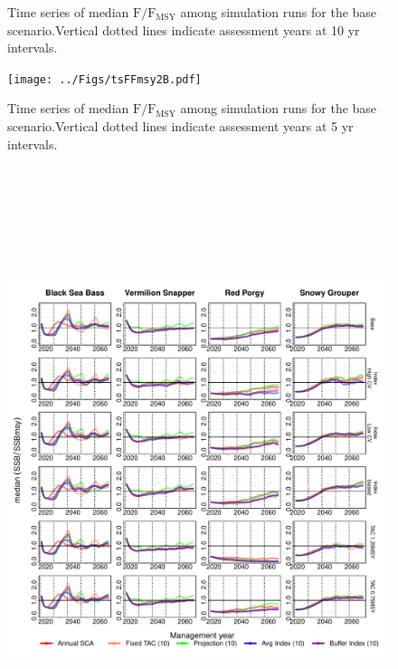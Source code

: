 \documentclass[12pt,english]{article}
\begin{document}
\begin{appendix}
\begin{figure}[!ht]
\begin{center}
\end{center}
\begin{flushleft}
\caption{Time series of median $\mathrm{F/F_{MSY}}$ among simulation runs for the base scenario.Vertical dotted lines indicate assessment years at 10 yr intervals.}
\label{fig:tsFFmsy2}
\end{flushleft}
\end{figure}
\clearpage\begin{figure}[!ht]
\begin{center}
\texttt{[image: ../Figs/tsFFmsy2B.pdf]}
\end{center}
\begin{flushleft}
\caption{Time series of median $\mathrm{F/F_{MSY}}$ among simulation runs for the base scenario.Vertical dotted lines indicate assessment years at 5 yr intervals.}
\label{fig:tsFFmsy2B}
\end{flushleft}
\end{figure}
\clearpage\begin{figure}[!ht]
\begin{center}
\includegraphics[width=6in, height=7in]{../Figs/tsSSBSSBmsy2.pdf}

\end{center}
\end{figure}
\end{appendix}
\end{document}
